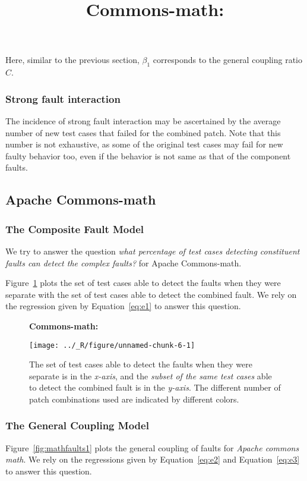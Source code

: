 \documentclass[preprint,nonatbib]{sigplanconf}\usepackage[]{graphicx}\usepackage[]{color}
\begin{document}
Here, similar to the previous section, $\beta_1$ corresponds to the general coupling ratio $C$.

\subsubsection{Strong fault interaction}

The incidence of strong fault interaction may be ascertained by the average number of new test
cases that failed for the combined patch. Note that this number is not exhaustive, as some of
the original test cases may fail for new faulty behavior too, even if the behavior is not same as that of the component faults.

\subsection{Apache Commons-math}

\subsubsection{The Composite Fault Model}
We try to answer the question \emph{what percentage of test cases detecting constituent faults can detect the complex faults?} for Apache Commons-math.

Figure~\ref{fig:mathfaults} plots the set of test cases able to detect
the faults when they were separate with the set of test cases able to
detect the combined fault. We rely on the regression given by Equation~\ref{eq:e1}
to answer this question.


\begin{figure}[t]
\centering\textbf{Commons-math: \couplingC}\par\medskip


{\centering \texttt{[image: ../\_R/figure/unnamed-chunk-6-1]} 

}


\caption{The set of test cases able to detect the faults when they were separate is in the \emph{x-axis},
  and the \emph{subset of the same test cases} able to detect the combined fault is in the \emph{y-axis}.
The different number of patch combinations used are indicated by different colors.
}
\title{Commons-math: \couplingC}

\label{fig:mathfaults}
\end{figure}


\subsubsection{The General Coupling Model}
Figure~\ref{fig:mathfaults1} plots the general coupling of faults for \emph{Apache commons math}.
We rely on the regressions given by Equation~\ref{eq:e2} and Equation~\ref{eq:e3} to answer this question.
\end{document}
